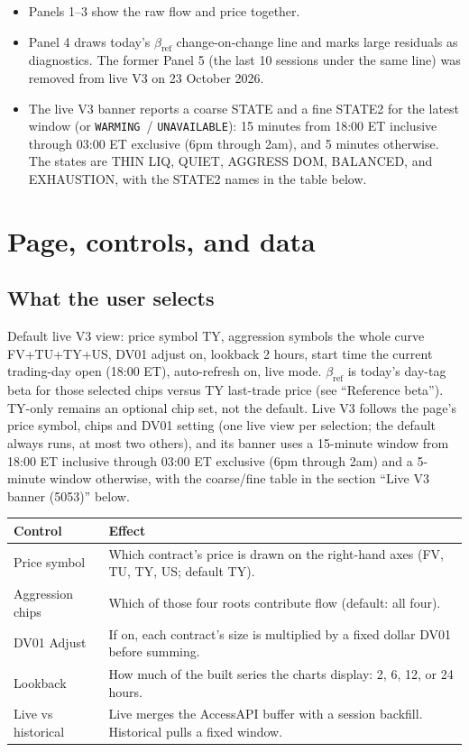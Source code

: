 \documentclass[11pt]{article}
\newcommand{\Warming}{\texttt{WARMING}}
\newcommand{\Unavailable}{\texttt{UNAVAILABLE}}
\begin{document}
\begin{itemize}
    \item Panels 1--3 show the raw flow and price together.
    \item Panel 4 draws today's $\beta_{\mathrm{ref}}$ change-on-change line and marks large residuals as diagnostics. The former Panel 5 (the last 10 sessions under the same line) was removed from live V3 on 23 October 2026.
    \item The live V3 banner reports a coarse STATE and a fine STATE2 for the latest window (or \Warming\ / \Unavailable): 15 minutes from 18:00 ET inclusive through 03:00 ET exclusive (6pm through 2am), and 5 minutes otherwise. The states are THIN LIQ, QUIET, AGGRESS DOM, BALANCED, and EXHAUSTION, with the STATE2 names in the table below.
\end{itemize}

\section{Page, controls, and data}

\subsection{What the user selects}

Default live V3 view: price symbol TY, aggression symbols the whole curve FV+TU+TY+US, DV01 adjust on, lookback 2 hours, start time the current trading-day open (18:00 ET), auto-refresh on, live mode. $\beta_{\mathrm{ref}}$ is today's day-tag beta for those selected chips versus TY last-trade price (see ``Reference beta''). TY-only remains an optional chip set, not the default. Live V3 follows the page's price symbol, chips and DV01 setting (one live view per selection; the default always runs, at most two others), and its banner uses a 15-minute window from 18:00 ET inclusive through 03:00 ET exclusive (6pm through 2am) and a 5-minute window otherwise, with the coarse/fine table in the section ``Live V3 banner (5053)'' below.

\begin{center}
\begin{tabular}{@{}p{}p{}@{}}
\toprule
\textbf{Control} & \textbf{Effect} \\
\midrule
Price symbol & Which contract's price is drawn on the right-hand axes (FV, TU, TY, US; default TY). \\
Aggression chips & Which of those four roots contribute flow (default: all four). \\
DV01 Adjust & If on, each contract's size is multiplied by a fixed dollar DV01 before summing. \\
Lookback & How much of the built series the charts display: 2, 6, 12, or 24 hours. \\
Live vs historical & Live merges the AccessAPI buffer with a session backfill. Historical pulls a fixed window. \\
\bottomrule
\end{tabular}
\end{center}
\end{document}
